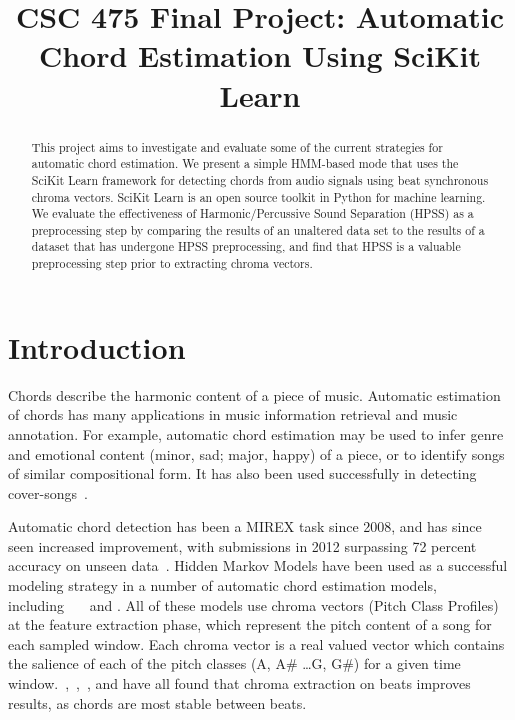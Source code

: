 \documentclass{article}
\title{CSC 475 Final Project: Automatic Chord Estimation Using SciKit Learn}
\begin{document}
%
\maketitle
%


\begin{abstract}

This project aims to investigate and evaluate some of the current strategies
for automatic chord estimation. We present a simple HMM-based mode that uses
the SciKit Learn framework for detecting chords from audio signals using beat
synchronous chroma vectors.  SciKit Learn is an open source toolkit in Python
for machine learning. We evaluate the effectiveness of Harmonic/Percussive
Sound Separation (HPSS) as a preprocessing step by comparing the results of an
unaltered data set to the results of a dataset that has undergone HPSS
preprocessing, and find that HPSS is a valuable preprocessing step prior to
extracting chroma vectors.

\end{abstract}

\section{Introduction}\label{sec:intro}

Chords describe the harmonic content of a piece of music. Automatic estimation
of chords has many applications in music information retrieval and music
annotation. For example, automatic chord estimation may be used to infer
genre and emotional content (minor, sad; major, happy) of a piece, or to
identify songs of similar compositional form.  It has also been used successfully in
detecting cover-songs~\cite{Papadopoulos:18}.

Automatic chord detection has been a MIREX task since 2008, and has since seen
increased improvement, with submissions in 2012 surpassing 72 percent accuracy
on unseen data~\cite{McVicar:00}. Hidden Markov Models have been used as a
successful modeling strategy in a number of automatic chord estimation models,
including~\cite{Ueda:01}~\cite{Lee:15}~\cite{Ueda:19} and
\cite{Papadopoulos:18}. All of these models use chroma vectors (Pitch Class
Profiles) at the feature extraction phase, which represent the pitch content
of a song for each sampled window. Each chroma vector is a real valued vector
which contains the salience of each of the pitch classes (A, A\# \dots G, G\#) for a
given time window.~\cite{McVicar:00},~\cite{Lee:15},~\cite{Papadopoulos:18},
and\cite{Zenz:20} have all found that chroma extraction on beats improves
results, as chords are most stable between beats.
\end{document}
